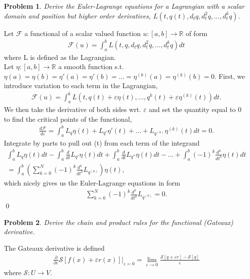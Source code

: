 \documentclass[12pt]{article}
\newtheorem{problem}{Problem}
\begin{document}
\newpage
\begin{problem}
Derive the Euler-Lagrange equations for a Lagrangian with a scalar domain and position but higher order derivatives, $L(t, q(t), d_tq, d_t^2q, ..., d_t^kq)$.
\end{problem}

Let $\mathcal{F}$ a functional of a scalar valued function $u:[a,b]\rightarrow \mathbb{R}$ of form
\begin{align*}
\mathcal{F}(u) = \int_a^b L(t, q, d_tq, d_t^2q, ..., d_t^kq)dt
\end{align*}
where L is defined as the Lagrangian. \\

Let $\eta:[a,b] \rightarrow \mathbb{R}$ a smooth function s.t. $\eta(a) = \eta(b) = \eta'(a) = \eta'(b) = ... = \eta^{(k)}(a) = \eta^{(k)}(b) = 0$. First, we introduce variation to each term in the Lagrangian,
\begin{align*}
\mathcal{F}(u) = \int_a^b L(t, q(t)+\varepsilon\eta(t),...,q^{k}(t)+\varepsilon\eta^{(k)}(t))dt.
\end{align*}
We then take the derivative of both sides wrt. $\varepsilon$ and set the quantity equal to 0 to find the critical points of the functional,
\begin{align*}
\frac{d\mathcal{F}}{d\varepsilon} = \int_a^b L_q \eta(t) + L_{q'}\eta'(t) +...+L_{q^{(k)}} \eta^{(k)}(t)dt = 0.
\end{align*}
Integrate by parts to pull out \eta(t) from each term of the integrand
\begin{gather*}
\int_a^b L_q\eta(t)dt - \int_a^b \frac{d}{dt} L_{q'} \eta(t)dt + \int_a^b \frac{d}{dt} L_{q''} \eta(t)dt - ... + \int_a^b(-1)^k \frac{d^k}{dt^k} \eta(t) dt \\
= \int_a^b (\sum_{k=0}^N (-1)^k \frac{d^k}{dt^k} L_{q^{(k)}})\eta(t) ,
\end{gather*}
which nicely gives us the Euler-Lagrange equations in form
\begin{align*}
    \sum_{k=0}^N (-1)^k \frac{d^k}{dt^k}L_{q^{(k)}} = 0.
\end{align*}
\qed


\newpage
\begin{problem}
Derive the chain and product rules for the functional (Gateaux) derivative.
\end{problem}


The Gateaux derivative is defined 
\begin{align*}
    \frac{\partial}{\partial \varepsilon} \mathcal{S}[f(x)+\varepsilon r(x)] \bigg|_{\varepsilon = 0} 
    = \lim_{\varepsilon \rightarrow 0}\frac{\mathcal{S}[q+\varepsilon r] - \mathcal{S}[q]}{\varepsilon} 
\end{align*}
where $\mathcal{S}: U \rightarrow V$. \\
\end{document}
